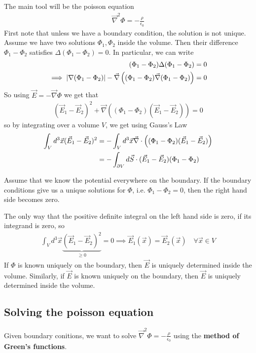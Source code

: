 The main tool will be the poisson equation
\begin{align*}
  \vec{\nabla}^{2} \Phi = - \frac{\rho}{\epsilon_0}
\end{align*}
First note that unless we have a boundary condition, the solution is not unique.
Assume we have two solutions $\Phi_1, \Phi_2$ inside the volume. 
Then their difference $\Phi_1 - \Phi_2$ satisfies $ \Delta(\Phi_1 - \Phi_2) = 0$.
In particular, we can write
\begin{align*}
  (\Phi_1 - \Phi_2)\Delta (\Phi_1 - \Phi_2) &= 0\\
  \implies \vert
    \nabla(\Phi_1 - \Phi_2) 
  \vert
  - \vec{\nabla}\left(
    (\Phi_1 - \Phi_2) \vec{\nabla}(\Phi_1 - \Phi_2)
\right) &= 0
\end{align*}
So using $\vec{E} = - \vec{\nabla}\Phi$ we get that
\begin{align*}
  (\vec{E}_1 - \vec{E}_2)^{2} + \vec{\nabla} \left(
    (\Phi_1 - \Phi_2) (\vec{E}_1 - \vec{E}_2)
  \right)
  = 0
\end{align*}
so by integrating over a volume $V$, we get using Gauss's Law
\begin{align*}
  \int_V d^{3} \vec{x} (\vec{E}_1 - \vec{E}_2)^{2}
  &=
  - \int_V d^{3} \vec{x} \vec{\nabla} \cdot \left(
    (\Phi_1 - \Phi_2) (\vec{E}_1 - \vec{E}_2)
  \right)\\
  &= - \int_{\partial V} d \vec{S} \cdot (\vec{E}_1 - \vec{E}_2)(\Phi_1 - \Phi_2)
\end{align*}


Assume that we know the potential everywhere on the boundary.
If the boundary conditions give us a unique solutions for $\Phi$, i.e. $\Phi_1 - \Phi_2 = 0$, then the right hand side becomes zero.

The only way that the positive definite integral on the left hand side is zero, if its integrand is zero, so
\begin{align*}
  \int_V d^{3} \vec{x} \underbrace{(\vec{E}_1 - \vec{E}_2)^{2}}_{\geq 0} = 0 \implies \vec{E}_1(\vec{x}) = \vec{E}_2(\vec{x}) \quad \forall \vec{x} \in V
\end{align*}
If $\Phi$ is known uniquely on the boundary, then $\vec{E}$ is uniquely determined inside the volume.
Similarly, if $\vec{E}$ is known uniquely on the boundary, then $\vec{E}$ is uniquely determined inside the volume.

\subsection{Solving the poisson equation}
Given boundary conitions, we want to solve $\vec{\nabla}^{2} \Phi = - \frac{\rho}{\epsilon_0}$ using the \textbf{method of Green's functions}.

